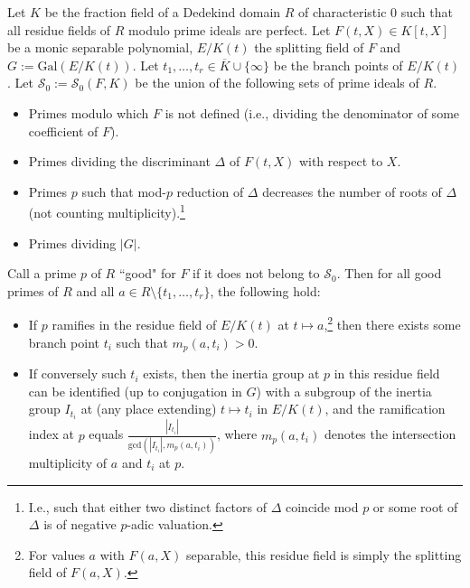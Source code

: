 \documentclass[a4paper]{amsart}
\begin{document}
  \begin{theorem}
  \label{thm:spec_in}
  Let $K$ be the fraction field of a Dedekind domain $R$ of characteristic $0$ such that all residue fields of $R$ modulo prime ideals are perfect. Let $F(t,X)\in K[t,X]$ be a monic separable polynomial, %
 $E/K(t)$ the splitting field of $F$ and $G:=\mathrm{Gal}(E/K(t))$. 
Let $t_1,\dots, t_r\in \overline{K}\cup \{\infty\}$ be the branch points of $E/K(t)$. 
  Let $\mathcal{S}_0:=\mathcal{S}_0(F,K)$ be the union of the following sets of prime ideals of $R$.
  \begin{itemize}
  \item[i)] Primes modulo which $F$ is not defined (i.e., dividing the denominator of some coefficient of $F$).
  \item[ii)] Primes dividing the discriminant $\Delta$ of $F(t,X)$ with respect to $X$. %
  \item[iii)] Primes $p$ such that mod-$p$ reduction of $\Delta$ decreases the number of roots of $\Delta$ (not counting multiplicity).\footnote{I.e., such that either two distinct factors of $\Delta$ coincide mod $p$ or some root of $\Delta$ is of negative $p$-adic valuation.}
  \item[iv)] Primes dividing $|G|$.
  \end{itemize}
  Call a prime $p$ of $R$ ``good" for $F$ if it does not belong to $\mathcal{S}_0$. Then for all good primes of $R$ and all $a\in R\setminus\{t_1,\dots, t_r\}$, the following hold:
  \begin{itemize}
  \item[a)] If $p$ ramifies in the residue field of $E/K(t)$ at $t\mapsto a$,\footnote{For values $a$ with $F(a,X)$ separable, this residue field is simply the splitting field of $F(a,X)$.} then there exists some branch point $t_i$ such that $m_p(a,t_i)>0$. 
  \item[b)] If conversely such $t_i$ exists, then the inertia group at $p$ in this residue field can be identified (up to conjugation in $G$) with a subgroup of the inertia group $I_{t_i}$ at (any place extending) $t\mapsto t_i$ in $E/K(t)$, and the ramification index at $p$ equals $\frac{|I_{t_i}|}{\textrm{gcd}(|I_{t_i}|, m_p(a,t_i))}$, where $m_p(a,t_i)$ denotes the intersection multiplicity of $a$ and $t_i$ at $p$.
  \end{itemize}  
  \end{theorem}
\end{document}
